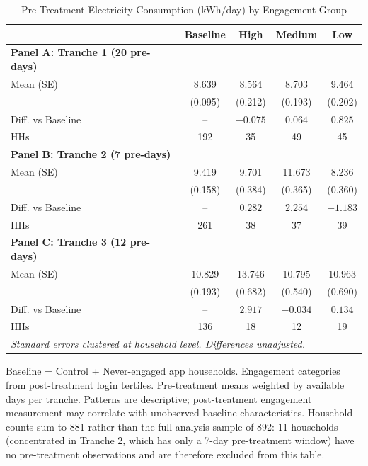 \begin{table}[htbp]
\centering
\caption{Pre-Treatment Electricity Consumption (kWh/day) by Engagement Group}
\label{tab:pre_engagement}
\begin{threeparttable}
\begin{tabular}{lcccc}
\toprule
 & Baseline & High & Medium & Low \\
\midrule
\textbf{Panel A: Tranche 1 (20 pre-days)} \\
Mean (SE) & 8.639 & 8.564 & 8.703 & 9.464 \\
 & (0.095) & (0.212) & (0.193) & (0.202) \\
Diff. vs Baseline & -- & $-0.075$ & $0.064$ & $0.825$ \\
HHs & 192 & 35 & 49 & 45 \\
\midrule
\textbf{Panel B: Tranche 2 (7 pre-days)} \\
Mean (SE) & 9.419 & 9.701 & 11.673 & 8.236 \\
 & (0.158) & (0.384) & (0.365) & (0.360) \\
Diff. vs Baseline & -- & $0.282$ & $2.254$ & $-1.183$ \\
HHs & 261 & 38 & 37 & 39 \\
\midrule
\textbf{Panel C: Tranche 3 (12 pre-days)} \\
Mean (SE) & 10.829 & 13.746 & 10.795 & 10.963 \\
 & (0.193) & (0.682) & (0.540) & (0.690) \\
Diff. vs Baseline & -- & $2.917$ & $-0.034$ & $0.134$ \\
HHs & 136 & 18 & 12 & 19 \\
\midrule
\multicolumn{5}{l}{\textit{Standard errors clustered at household level. Differences unadjusted.}} \\
\bottomrule
\end{tabular}
\begin{tablenotes}[flushleft]
\footnotesize
\item Baseline = Control + Never-engaged app households. Engagement categories from post-treatment login tertiles. Pre-treatment means weighted by available days per tranche. Patterns are descriptive; post-treatment engagement measurement may correlate with unobserved baseline characteristics. Household counts sum to 881 rather than the full analysis sample of 892: 11 households (concentrated in Tranche 2, which has only a 7-day pre-treatment window) have no pre-treatment observations and are therefore excluded from this table.
\end{tablenotes}
\end{threeparttable}
\end{table}
